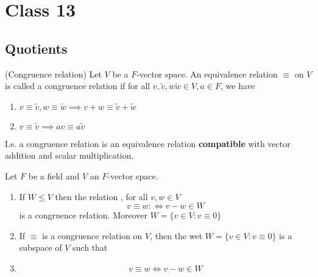 \section{Class 13}

\subsection{Quotients}

\begin{definition} 
    (Congruence relation) Let $V$ be a $F$-vector space. An equivalence relation $\equiv$ on $V$ is called a congruence relation if for all $v, \tilde{v}, w \tilde{w} \in V, a \in F$, we have 
    \begin{enumerate}
        \item $v \equiv \tilde{v}, w \equiv \tilde{w} \implies v + w \equiv \tilde{v} + \tilde{w}$ 
        \item $v \equiv \tilde{v} \implies av \equiv a \tilde{v}$
    \end{enumerate}

    I.e. a congruence relation is an equivalence relation \textbf{compatible} with vector addition and scalar multiplication.
\end{definition}

\begin{proposition}
    Let $F$ be a field and $V$ an $F$-vector space. 
    \begin{enumerate}
        \item If $W \leq V$ then the relation , for all $v, w \in V$
        \[
            v \equiv w : \iff v - w \in W
        \]
        is a congruence relation. Moreover $W = \{ v \in V: v \equiv 0 \} $
        \item If $\equiv$ is a congruence relation on $V$, then the wet $W = \{ v \in V: v \equiv 0 \} $ is a subspace of $V$ such that 
        \item \[
            v \equiv w \iff v - w \in W
        \]
    \end{enumerate} 
\end{proposition}

